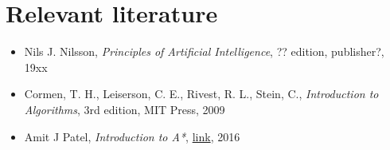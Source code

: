 \documentclass[11pt]{article}
\begin{document}
\section{Relevant literature}
\begin{itemize}
\item Nils J. Nilsson, \textit{Principles of Artificial Intelligence}, ?? edition, publisher?, 19xx

\item Cormen, T. H., Leiserson, C. E., Rivest, R. L., Stein, C., \textit{Introduction to Algorithms}, 3rd edition, MIT Press, 2009

\item Amit J Patel, \textit{Introduction to A*}, \href{http://theory.stanford.edu/~amitp/GameProgramming/AStarComparison.html}{link}, 2016

\end{itemize}
\end{document}

